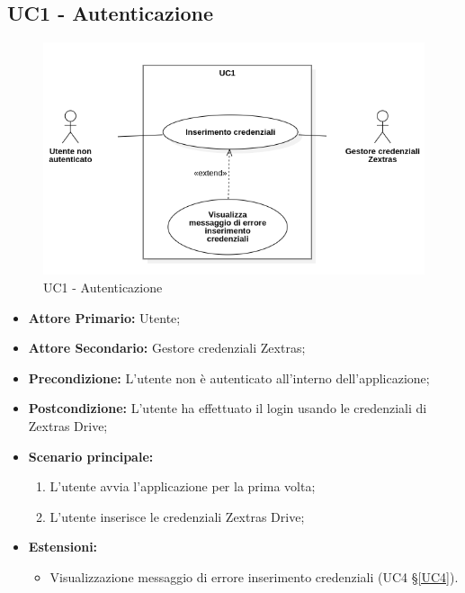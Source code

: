\subsection{UC1 - Autenticazione}
\begin{figure}[H]
    \centering
    \includegraphics[scale = 0.7]{components/img/UC1.png}
    \caption{UC1 - Autenticazione}
\end{figure}
\begin{itemize}
\item \textbf{Attore Primario:} Utente;
\item \textbf{Attore Secondario:} Gestore credenziali Zextras;
\item \textbf{Precondizione:} L'utente non è autenticato all'interno dell'applicazione;
\item \textbf{Postcondizione:} L'utente ha effettuato il login usando le credenziali di Zextras Drive;
\item \textbf{Scenario principale:}
    \begin{enumerate}
    \item L'utente avvia l'applicazione per la prima volta;
    \item L'utente inserisce le credenziali Zextras Drive;
    \end{enumerate}
\item \textbf{Estensioni:}
\begin{itemize}
\item Visualizzazione messaggio di errore inserimento credenziali (UC4 \S{}\ref{UC4}).
\end{itemize}
\end{itemize}